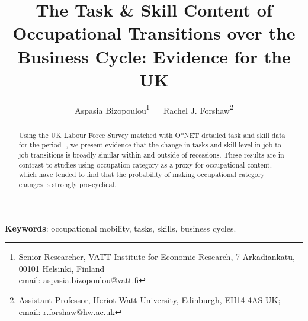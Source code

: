 \documentclass[11pt, oneside]{article}
\begin{document}
	



		
	\author{Aspasia Bizopoulou\footnote{Senior Researcher, VATT Institute for Economic Research, 7 Arkadiankatu, 00101 Helsinki, Finland\\ email: aspasia.bizopoulou@vatt.fi} $\quad$ Rachel J. Forshaw\footnote{Assistant Professor, Heriot-Watt University, Edinburgh, EH14 4AS UK; email: r.forshaw@hw.ac.uk}} 
	\title{\textbf{The Task \& Skill Content of Occupational Transitions over the Business Cycle: Evidence for the UK}}

	
	\maketitle
	
	\vspace{-5mm}
	
	\begin{abstract}
		
		Using the UK Labour Force Survey matched with O*NET detailed task and skill data for the period \hspace{-1mm}-\hspace{-1mm}, we present evidence that the change in tasks and skill level in job-to-job transitions is broadly similar within and outside of recessions. These results are in contrast to studies using occupation category as a proxy for occupational content, which have tended to find that the probability of making occupational category changes is strongly pro-cyclical. 

	
	

		
	\end{abstract}

	\textbf{Keywords}: occupational mobility, tasks, skills, business cycles. 
	
	\vspace{2mm}
	
\end{document}
